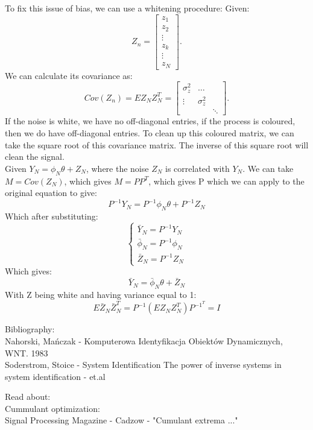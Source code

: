 To fix this issue of bias, we can use a whitening procedure:
{
    Given:
    \[
    Z_n = \begin{bmatrix}
        z_1 \\
        z_2\\
        \vdots\\
        z_k\\
        \vdots\\
        z_N
    \end{bmatrix}
    .\] 
    We can calculate its covariance as:
    \[
    Cov(Z_n) = EZ_NZ_N^{T} = \begin{bmatrix}
        \sigma_z^{2} & \dots & \\
        \vdots & \sigma_z^{2} &\\
         & & \ddots
    \end{bmatrix}
    .\] 
    If the noise is white, we have no off-diagonal entries, if the process is coloured, then we do have off-diagonal entries.
To clean up this coloured matrix, we can take the square root of this covariance matrix. The inverse of this square root will clean the signal.\\
Given $Y_N = \phi_N \theta + Z_N$, where the noise  $Z_N$ is correlated with  $Y_N$. We can take  $M = Cov(Z_N)$, which gives  $M = PP^{T}$, which gives P which we can apply to the original equation to give:
\begin{equation}
    P^{-1}Y_N =  P^{-1}\phi_N\theta + P^{-1}Z_N
\end{equation}
Which after substituting:
\begin{equation}
    \begin{cases}
        \bar{Y}_N = P^{-1}Y_N\\
        \bar{\phi}_N = P^{-1}\phi_N\\
        \bar{Z}_N = P^{-1}Z_N
    \end{cases}
\end{equation}
Which gives:
\begin{equation}
    \bar{Y}_N = \bar{\phi}_N\theta + \bar{Z}_N
\end{equation}
With Z being white and having variance equal to 1:
\begin{equation}
    E\bar{Z}_N\bar{Z}^{T}_N = P^{-1}(EZ_NZ^{T}_N)P^{-1^{T}} = I
\end{equation}
}


\nt
{
Bibliography:\\
Nahorski, Mańczak - Komputerowa Identyfikacja Obiektów Dynamicznych, WNT. 1983\\
Soderstrom, Stoice - System Identification
The power of inverse systems in system identification - et.al


Read about:\\
Cummulant optimization:\\
Signal Processing Magazine - Cadzow - "Cumulant extrema ..."
}
